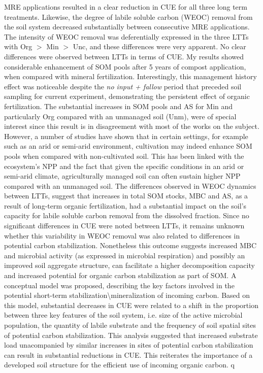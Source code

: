 	MRE applications resulted in a clear reduction in CUE for all three long term treatments. Likewise, the degree of labile soluble carbon (WEOC) removal from the soil system decreased substantially between consecutive MRE applications. The intensity of WEOC removal was deferentially expressed in the three LTTs with Org $  > $ Min $ > $ Unc, and these differences were very apparent. No clear differences were observed between LTTs in terms of CUE.
	My results showed considerable enhancement of SOM pools after 5 years of compost application, when compared with mineral fertilization. Interestingly, this management history effect was noticeable despite the \textit{no input + fallow} period that preceded soil sampling for current experiment, demonstrating the persistent effect of organic fertilization. The substantial increases in SOM pools and AS for Min and particularly Org compared with an unmanaged soil (Unm), were of special interest since this result is in disagreement with most of the works on the subject. However, a number of studies have shown that in certain settings, for example such as an arid or semi-arid environment, cultivation may indeed enhance SOM pools when compared with non-cultivated soil. This has been linked with the ecosystem's NPP and the fact that given the specific conditions in an arid or semi-arid climate, agriculturally managed soil can often sustain higher NPP compared with an unmanaged soil.
	The differences observed in WEOC dynamics between LTTs, suggest that increases in total SOM stocks, MBC and AS, as a result of long-term organic fertilization, had a substantial impact on the soil's capacity for labile soluble carbon removal from the dissolved fraction. Since no significant differences in CUE were noted between LTTs, it remains unknown whether this variability in WEOC removal was also related to differences in potential carbon stabilization. Nonetheless this outcome suggests increased MBC and microbial activity (as expressed in microbial respiration) and possibly an improved soil aggregate structure, can facilitate a higher decomposition capacity and increased potential for organic carbon stabilization as part of SOM.
	A conceptual model was proposed, describing the key factors involved in the potential short-term stabilization\textbackslash mineralization of incoming carbon. Based on this model, substantial decreases in CUE were related to a shift in the proportion between three key features of the soil system, i.e. size of the active microbial population, the quantity of labile substrate and the frequency of soil spatial sites of potential carbon stabilization. This analysis suggested that increased substrate load unacompanied by similar increases in sites of potential carbon stabilization can result in substantial reductions in CUE. This reiterates the importance of a developed soil structure for the efficient use of incoming organic carbon.
	q         
	
	
     